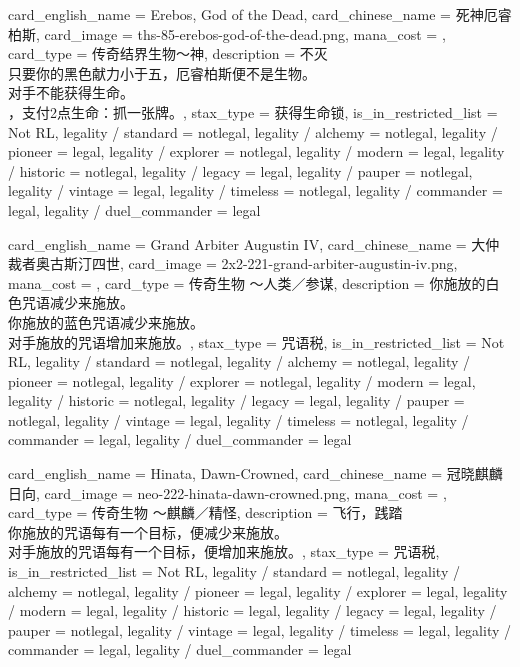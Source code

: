 \documentclass[lang = cn, color = black, 10pt]{AllThatStax}
\begin{document}
\card
{
	card_english_name = {Erebos, God of the Dead},
	card_chinese_name = {死神厄睿柏斯},
	card_image = ths-85-erebos-god-of-the-dead.png,
	mana_cost = ,
	card_type = 传奇结界生物～神,
	description = {不灭\\
		只要你的黑色献力小于五，厄睿柏斯便不是生物。\\
		对手不能获得生命。\\
		，支付2点生命：抓一张牌。},
	stax_type = 获得生命锁,
	is_in_restricted_list = Not RL,
	legality / standard = notlegal,
	legality / alchemy = notlegal,
	legality / pioneer = legal,
	legality / explorer = notlegal,
	legality / modern = legal,
	legality / historic = notlegal,
	legality / legacy = legal,
	legality / pauper = notlegal,
	legality / vintage = legal,
	legality / timeless = notlegal,
	legality / commander = legal,
	legality / duel_commander = legal
}

\card
{
	card_english_name = {Grand Arbiter Augustin IV},
	card_chinese_name = {大仲裁者奥古斯汀四世},
	card_image = 2x2-221-grand-arbiter-augustin-iv.png,
	mana_cost = ,
	card_type = 传奇生物 ～人类／参谋,
	description = {你施放的白色咒语减少来施放。\\
		你施放的蓝色咒语减少来施放。\\
		对手施放的咒语增加来施放。},
	stax_type = 咒语税,
	is_in_restricted_list = Not RL,
	legality / standard = notlegal,
	legality / alchemy = notlegal,
	legality / pioneer = notlegal,
	legality / explorer = notlegal,
	legality / modern = legal,
	legality / historic = notlegal,
	legality / legacy = legal,
	legality / pauper = notlegal,
	legality / vintage = legal,
	legality / timeless = notlegal,
	legality / commander = legal,
	legality / duel_commander = legal
}

\card
{
	card_english_name = {Hinata, Dawn-Crowned},
	card_chinese_name = {冠晓麒麟日向},
	card_image = neo-222-hinata-dawn-crowned.png,
	mana_cost = ,
	card_type = 传奇生物 ～麒麟／精怪,
	description = {飞行，践踏\\
		你施放的咒语每有一个目标，便减少来施放。\\
		对手施放的咒语每有一个目标，便增加来施放。},
	stax_type = 咒语税,
	is_in_restricted_list = Not RL,
	legality / standard = notlegal,
	legality / alchemy = notlegal,
	legality / pioneer = legal,
	legality / explorer = legal,
	legality / modern = legal,
	legality / historic = legal,
	legality / legacy = legal,
	legality / pauper = notlegal,
	legality / vintage = legal,
	legality / timeless = legal,
	legality / commander = legal,
	legality / duel_commander = legal
}
\end{document}
